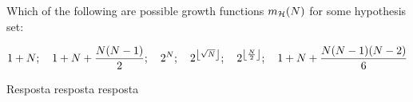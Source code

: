 \begin{enunciado}{8}
    Which of the following are possible growth functions $m_{\mathcal{H}}(N)$ for some hypothesis set:
    
    $$1+N; \quad 1+N+\frac{N(N-1)}{2}; \quad 
    2^N; \quad 2^{\left\lfloor \sqrt{N} \right\rfloor}; \quad 
    2^{\left\lfloor \frac{N}{2} \right\rfloor}; \quad
    1+N+\frac{N(N-1)(N-2)}{6}$$
\end{enunciado}

Resposta resposta resposta